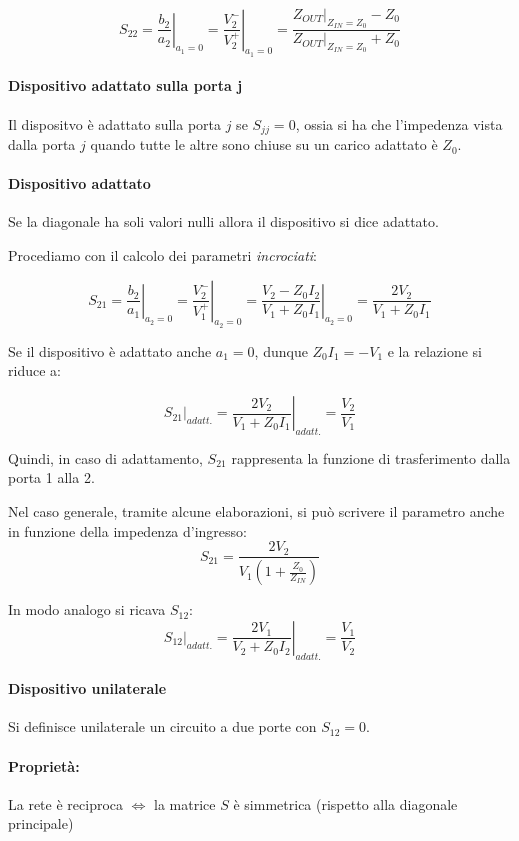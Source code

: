 $$S_{22} = \left.\frac{b_2}{a_2}\right|_{a_1=0}
= \left.\frac{V_2^-}{V_2^+}\right|_{a_1=0}
=
\frac{\left.Z_{OUT}\right|_{Z_{IN}=Z_0} - Z_0}
{\left.Z_{OUT}\right|_{Z_{IN}=Z_0} + Z_0}$$



\paragraph{Dispositivo adattato sulla porta j} Il dispositvo è adattato sulla porta $j$ se $S_{jj} = 0$, ossia si ha che l'impedenza vista dalla porta $j$ quando tutte le altre sono chiuse su un carico adattato è $Z_0$.
\paragraph{Dispositivo adattato} Se la diagonale ha soli valori nulli allora il dispositivo si dice adattato.


Procediamo con il calcolo dei parametri \textit{incrociati}:

$$S_{21} = \left. \frac{b_2}{a_1} \right|_{a_2 = 0}
=
\left. \frac{V_2^-}{V_1^+} \right|_{a_2 = 0}
=
\left. \frac{V_2 - Z_0 I_2}{V_1 + Z_0 I_1} \right|_{a_2 = 0}
= \frac{2V_2}{V_1 + Z_0 I_1}$$

Se il dispositivo è adattato anche $a_1 = 0$, dunque $Z_0 I_1 = -V_1$ e la relazione si riduce a:

\[
\left. S_{21} \right|_{adatt.} =
\left. \frac{2V_2}{V_1 + Z_0 I_1} \right|_{adatt.} = \frac{V_2}{V_1}
\]

Quindi, in caso di adattamento, $S_{21}$ rappresenta la funzione di trasferimento dalla porta 1 alla 2.

Nel caso generale, tramite alcune elaborazioni, si può scrivere il parametro anche in funzione della impedenza d'ingresso:
$$S_{21} =
\frac{2 V_2}{V_1 \left( 1 + \frac{Z_0}{Z_{IN}} \right)}$$

In modo analogo si ricava $S_{12}$:
\[
\left. S_{12} \right|_{adatt.} =
\left. \frac{2V_1}{V_2 + Z_0 I_2} \right|_{adatt.} = \frac{V_1}{V_2}
\]


\paragraph{Dispositivo unilaterale} Si definisce unilaterale un circuito a due porte con $S_{12} = 0$. 

\paragraph{Proprietà:}
La rete è reciproca $\Leftrightarrow$ la matrice $S$ è simmetrica (rispetto alla diagonale principale)

